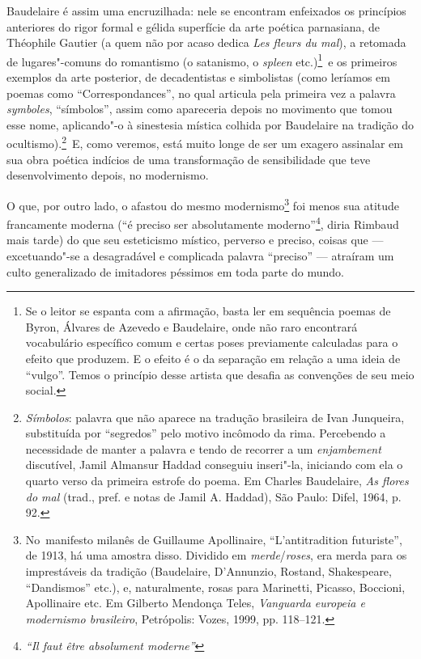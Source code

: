 Baudelaire é assim uma encruzilhada: nele se encontram enfeixados os
princípios anteriores do rigor formal e gélida superfície da arte
poética parnasiana, de Théophile Gautier (a quem não por acaso dedica
 \textit{Les fleurs du mal}), a retomada de lugares"-comuns do
romantismo (o satanismo, o \textit{spleen} etc.)\footnote{ Se o leitor
se espanta com a afirmação, basta ler em sequência poemas de Byron,
Álvares de Azevedo e Baudelaire, onde não raro encontrará vocabulário
específico comum e certas poses previamente calculadas para o efeito
que produzem. E o efeito é o da separação em relação a uma ideia de
“vulgo”. Temos o princípio desse artista que desafia as convenções de
seu meio social.}~e os primeiros exemplos da arte posterior, de
decadentistas e simbolistas (como leríamos em poemas como
“Correspondances”, no qual articula pela primeira vez a palavra
\textit{symboles}, “símbolos”, assim como apareceria depois no
movimento que tomou esse nome, aplicando"-o à sinestesia mística
colhida por Baudelaire na tradição do ocultismo).\footnote{ \textit{Símbolos}: 
palavra que não aparece na tradução brasileira de Ivan Junqueira,
substituída por “segredos” pelo motivo incômodo da rima. Percebendo a
necessidade de manter a palavra e tendo de recorrer a um \textit{enjambement}
discutível, Jamil Almansur Haddad conseguiu inseri"-la, iniciando com
ela o quarto verso da primeira estrofe do poema. Em Charles Baudelaire,
 \textit{As flores do mal} (trad., pref. e notas de Jamil A.
Haddad), São Paulo: Difel, 1964, p. 92.}~E, como veremos, está muito
longe de ser um exagero assinalar em sua obra poética indícios de uma
transformação de sensibilidade que teve desenvolvimento depois, no
modernismo.

O que, por outro lado, o afastou do mesmo modernismo\footnote{ No~manifesto 
milanês de Guillaume Apollinaire, “L’antitradition
futuriste”, de 1913, há uma amostra disso. Dividido em \textit{merde}/\textit{roses}, era
merda para os imprestáveis da tradição (Baudelaire, D’Annunzio,
Rostand, Shakespeare, “Dandismos” etc.), e, naturalmente, rosas para
Marinetti, Picasso, Boccioni, Apollinaire etc. Em Gilberto Mendonça Teles,
\textit{Vanguarda europeia e modernismo brasileiro}, Petrópolis:
Vozes, 1999, pp. 118--121.} foi menos sua atitude francamente
moderna (“é preciso ser absolutamente moderno”\footnote{ 
\textit{“Il faut être absolument moderne”}}, diria Rimbaud mais
tarde) do que seu esteticismo místico, perverso e preciso, coisas que ---
excetuando"-se a desagradável e complicada palavra “preciso” ---
atraíram um culto generalizado de imitadores péssimos em toda parte do
mundo. 

